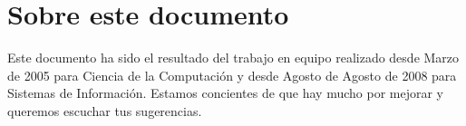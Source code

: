 \chapter*{Sobre este documento}\label{chap:lessons}
%

Este documento ha sido el resultado del trabajo en equipo realizado desde 
Marzo de 2005 para Ciencia de la Computación y desde Agosto de Agosto de 2008 para Sistemas de Información.
Estamos concientes de que hay mucho por mejorar y queremos escuchar tus sugerencias.

%
%
